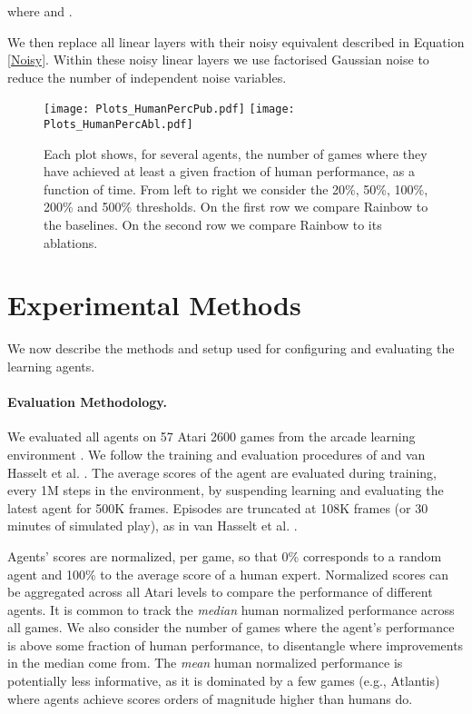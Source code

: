 \documentclass[letterpaper]{article} \usepackage{aaai18}  \usepackage{times}  \usepackage{helvet}  \usepackage{courier}  \usepackage{url}  \usepackage{graphicx}  \usepackage{amsmath,amssymb}
\begin{document}
where  and .

We then replace all linear layers with their noisy equivalent described in Equation \eqref{Noisy}. Within these noisy linear layers we use factorised Gaussian noise \cite{FortunatoAPMOGM17} to reduce the number of independent noise variables. 

\begin{figure*}
\centering
\texttt{[image: Plots\_HumanPercPub.pdf]}
\texttt{[image: Plots\_HumanPercAbl.pdf]}
\vspace*{-2em}
\caption{Each plot shows, for several agents, the number of games where they have achieved at least a given fraction of human performance, as a function of time. From left to right we consider the 20\%, 50\%, 100\%, 200\% and 500\% thresholds. On the first row we compare Rainbow to the baselines. On the second row we compare Rainbow to its ablations.
\label{fig:num_games}}
\end{figure*}


\section{Experimental Methods}

We now describe the methods and setup used for configuring and evaluating the learning agents.

\paragraph{Evaluation Methodology.}
We evaluated all agents on 57 Atari 2600 games from the arcade learning environment \cite{bellemare2013arcade}. We follow the training and evaluation procedures of \citeauthor{Mnih2015}   and van Hasselt et al. . The average scores of the agent are evaluated during training, every 1M steps in the environment, by suspending learning and evaluating the latest agent for 500K frames. Episodes are truncated at 108K frames (or 30 minutes of simulated play), as in van Hasselt et al. .

Agents' scores are normalized, per game, so that 0\% corresponds to a random agent and 100\% to the average score of a human expert. Normalized scores can be aggregated across all Atari levels to compare the performance of different agents. It is common to track the \emph{median} human normalized performance across all games. We also consider the number of games where the agent's performance is above some fraction of human performance, to disentangle where improvements in the median come from. The \emph{mean} human normalized performance is potentially less informative, as it is dominated by a few games (e.g., Atlantis) where agents achieve scores orders of magnitude higher than humans do. 
\end{document}
